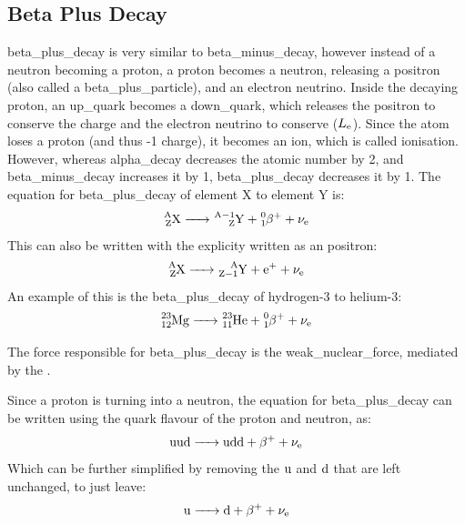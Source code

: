     \subsection{Beta Plus Decay} \label{beta_plus}
        \Gls{beta_plus_decay} is very similar to \gls{beta_minus_decay}, however instead of a \gls{neutron} becoming a \gls{proton}, a \gls{proton} becomes a \gls{neutron}, releasing a \gls{positron} (also called a \gls{beta_plus_particle}), and an electron \gls{neutrino}.
        Inside the decaying \gls{proton}, an \gls{up_quark} becomes a \gls{down_quark}, which releases the \gls{positron} to conserve the charge and the electron \gls{neutrino} to conserve  ($\leptonnumber[e]$).
        Since the \gls{atom} loses a \gls{proton} (and thus -1 charge), it becomes an \gls{ion}, which is called ionisation.
        However, whereas \gls{alpha_decay} decreases the atomic number by 2, and \gls{beta_minus_decay} increases it by 1, \gls{beta_plus_decay} decreases it by 1.
        The equation for \gls{beta_plus_decay} of element X to element Y is:
        \begin{equation}
            \ce{_Z^AX -> _Z^{A-1}Y + _{1}^0{\betaparticle[+]} + {\neutrino[e]}}
        \end{equation}
        This can also be written with the  explicity written as an \gls{positron}:
        \begin{equation}
            \ce{_Z^AX -> _{Z-1}^AY + {\electron[+]} + {\neutrino[e]}}
        \end{equation}
        An example of this is the \gls{beta_plus_decay} of hydrogen-3 to helium-3:
        \begin{equation}
            \ce{_{12}^{23}Mg -> _{11}^{23}He + _{1}^0{\betaparticle[+]} + {\neutrino[e]}}
        \end{equation}

        The force responsible for \gls{beta_plus_decay} is the \gls{weak_nuclear_force}, mediated by the .

        Since a \gls{proton} is turning into a \gls{neutron}, the equation for \gls{beta_plus_decay} can be written using the \gls{quark} flavour of the \gls{proton} and \gls{neutron}, as:
        \begin{equation}
            \ce{{\baryonquarks[uud]} -> {\baryonquarks[udd]} + {\betaparticle[+]} + {\neutrino[e]}}
        \end{equation}
        Which can be further simplified by removing the $\upquark$ and $\downquark$ that are left unchanged, to just leave:
        \begin{equation}
            \ce{{\upquark} -> {\downquark} + {\betaparticle[+]} + {\neutrino[e]}}
        \end{equation}

